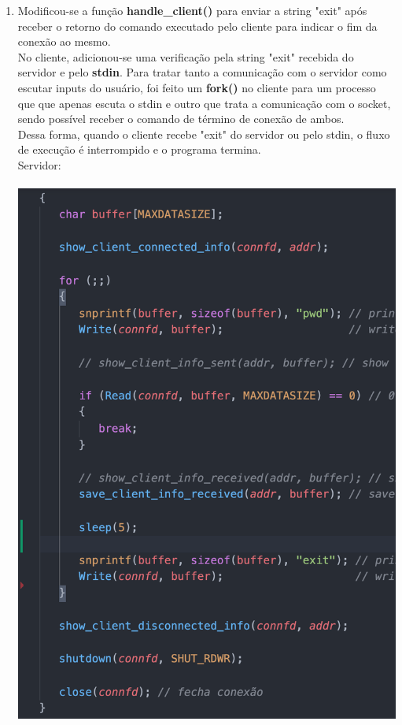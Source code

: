 \documentclass[12pt,a4paper]{report}
\begin{document}
\begin{enumerate}
    \item Modificou-se a função \textbf{handle\_client()} para enviar a string "exit" após receber o retorno do comando executado pelo cliente para indicar o fim da conexão ao mesmo. 
    \\
    No cliente, adicionou-se uma verificação pela string "exit" recebida do servidor e pelo \textbf{stdin}. Para tratar tanto a comunicação com o servidor como escutar inputs do usuário, foi feito um \textbf{fork()} no cliente para um processo que que apenas escuta o stdin e outro que trata a comunicação com o socket, sendo possível receber o comando de término de conexão de ambos.
    \\
    Dessa forma, quando o cliente recebe "exit" do servidor ou pelo stdin, o fluxo de execução é interrompido e o programa termina.
    \\
    Servidor:\\\\
    \includegraphics[width=13cm]{images/ex4-servidor-codigo.png}\\

\end{enumerate}
\end{document}
